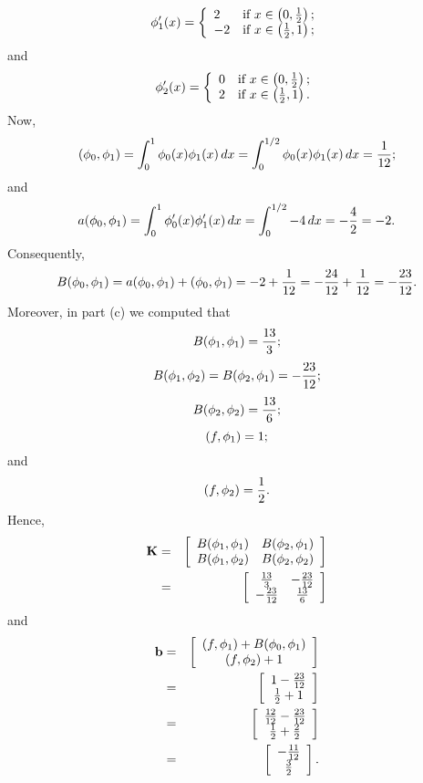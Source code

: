 \begin{solution}
\begin{enumerate}
\[\]
\[
\phi_1'(x) = \left\{\begin{array}{ll}
2 & \mbox{if }x\in\left(0,{1 \over 2}\right); \\ -2 & \mbox{if }x\in\left({1 \over 2},1\right);\end{array}\right.
\]
and
\[
\phi_2'(x) = \left\{\begin{array}{ll}
0 & \mbox{if }x\in\left(0,{1 \over 2}\right); \\ 2 & \mbox{if }x\in\left({1 \over 2},1\right).\end{array}\right.
\]
Now,
\[
(\phi_0,\phi_1)=\int_0^1\phi_0(x)\phi_1(x)\,dx=\int_0^{1/2}\phi_0(x)\phi_1(x)\,dx={1 \over 12};
\]
and
\[
a(\phi_0,\phi_1)=\int_0^1\phi_0'(x)\phi_1'(x)\,dx=\int_0^{1/2}-4\,dx=-{4 \over 2}=-2.
\]
Consequently,
\[
B(\phi_0,\phi_1)=a(\phi_0,\phi_1)+(\phi_0,\phi_1)=-2+{1 \over 12}=-{24 \over 12}+{1 \over 12}=-{23 \over 12}.
\]
Moreover, in part (c) we computed that
\[
B(\phi_1,\phi_1)={13 \over 3};
\]
\[
B(\phi_1,\phi_2)=B(\phi_2,\phi_1)=-{23 \over 12};
\]
\[
B(\phi_2,\phi_2)={13 \over 6};
\]
\[
(f,\phi_1)=1;
\]
and
\[
(f,\phi_2)={1 \over 2}.
\]
Hence,
\begin{eqnarray*}
{\bf K}&=&\left[\begin{array}{cc} B(\phi_1,\phi_1) & B(\phi_2,\phi_1) \\ B(\phi_1,\phi_2) & B(\phi_2,\phi_2)\end{array}\right]
\\
&=&\left[\begin{array}{cc} {13 \over 3} & -{23 \over 12} \\ -{23 \over 12} & {13 \over 6}\end{array}\right]
\end{eqnarray*}
and
\begin{eqnarray*}
{\bf b}&=&\left[\begin{array}{c}(f,\phi_1)+B(\phi_0,\phi_1) \\ (f,\phi_2)+1\end{array}\right]
\\
&=&\left[\begin{array}{c}1-{23 \over 12} \\ {1 \over 2}+1\end{array}\right]
\\
&=&\left[\begin{array}{c}{12 \over 12}-{23 \over 12} \\ {1 \over 2}+{2 \over 2}\end{array}\right]
\\
&=&\left[\begin{array}{c}-{11 \over 12} \\ {3 \over 2}\end{array}\right].
\end{eqnarray*}
\end{enumerate}
\end{solution}